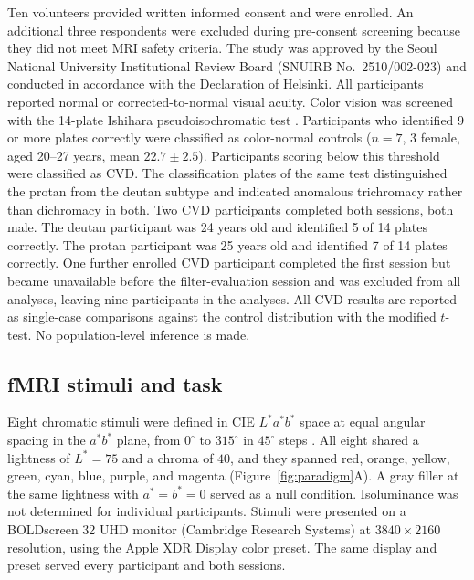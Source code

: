 Ten volunteers provided written informed consent and were enrolled. An additional three respondents were excluded during pre-consent screening because they did not meet MRI safety criteria. The study was approved by the Seoul National University Institutional Review Board (SNUIRB No.~2510/002-023) and conducted in accordance with the Declaration of Helsinki. All participants reported normal or corrected-to-normal visual acuity. Color vision was screened with the 14-plate Ishihara pseudoisochromatic test \parencite{ishihara1917}. Participants who identified 9 or more plates correctly were classified as color-normal controls ($n = 7$, 3 female, aged 20--27 years, mean $22.7 \pm 2.5$). Participants scoring below this threshold were classified as CVD. The classification plates of the same test distinguished the protan from the deutan subtype and indicated anomalous trichromacy rather than dichromacy in both. Two CVD participants completed both sessions, both male. The deutan participant was 24 years old and identified 5 of 14 plates correctly. The protan participant was 25 years old and identified 7 of 14 plates correctly. One further enrolled CVD participant completed the first session but became unavailable before the filter-evaluation session and was excluded from all analyses, leaving nine participants in the analyses. All CVD results are reported as single-case comparisons against the control distribution with the \textcite{crawford1998} modified $t$-test. No population-level inference is made.

\subsection{fMRI stimuli and task}
\label{sec:methods:stimuli}

Eight chromatic stimuli were defined in CIE $L^{*}a^{*}b^{*}$ space at equal angular spacing in the $a^{*}b^{*}$ plane, from $0^\circ$ to $315^\circ$ in $45^\circ$ steps \parencite{cie1986}. All eight shared a lightness of $L^{*} = 75$ and a chroma of $40$, and they spanned red, orange, yellow, green, cyan, blue, purple, and magenta (Figure~\ref{fig:paradigm}A). A gray filler at the same lightness with $a^{*} = b^{*} = 0$ served as a null condition. Isoluminance was not determined for individual participants. Stimuli were presented on a BOLDscreen 32 UHD monitor (Cambridge Research Systems) at $3840 \times 2160$ resolution, using the Apple XDR Display color preset. The same display and preset served every participant and both sessions.

